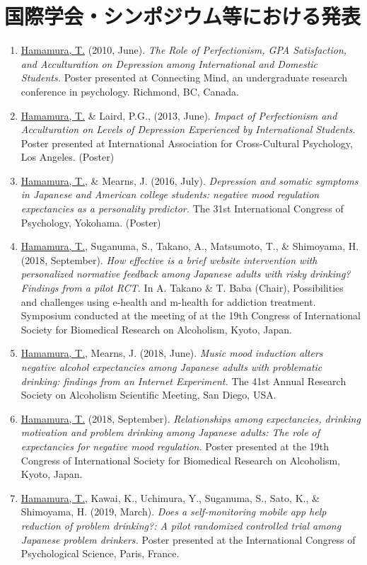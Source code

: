 \documentclass{article}
\begin{document}
\section{国際学会・シンポジウム等における発表}
\begin{enumerate}
	\item \underline{Hamamura, T.} (2010, June). \textit{The Role of Perfectionism, GPA Satisfaction, and Acculturation on Depression among International and Domestic Students.} Poster presented at Connecting Mind, an undergraduate research conference in psychology. Richmond, BC, Canada.
	\item \underline{Hamamura, T.} \& Laird, P.G., (2013, June). \textit{Impact of Perfectionism and Acculturation on Levels of Depression Experienced by International Students.} Poster presented at International Association for Cross-Cultural Psychology, Los Angeles. (Poster)
	\item \underline{Hamamura, T.}, \& Mearns, J. (2016, July). \textit{Depression and somatic symptoms in Japanese and American college students: negative mood regulation expectancies as a personality predictor.} The 31st International Congress of Psychology, Yokohama. (Poster)
	\item \underline{Hamamura, T.}, Suganuma, S., Takano, A., Matsumoto, T., \& Shimoyama, H. (2018, September). \textit{How effective is a brief website intervention with personalized normative feedback among Japanese adults with risky drinking? Findings from a pilot RCT.} In A. Takano \& T. Baba (Chair), Possibilities and challenges using e-health and m-health for addiction treatment. Symposium conducted at the meeting of at the 19th Congress of International Society for Biomedical Research on Alcoholism, Kyoto, Japan.
	\item \underline{Hamamura, T.}, Mearns, J. (2018, June). \textit{Music mood induction alters negative alcohol expectancies among Japanese adults with problematic drinking: findings from an Internet Experiment.} The 41st Annual Research Society on Alcoholism Scientific Meeting, San Diego, USA.
	\item \underline{Hamamura, T.} (2018, September). \textit{Relationships among expectancies, drinking motivation and problem drinking among Japanese adults: The role of expectancies for negative mood regulation.} Poster presented at the 19th Congress of International Society for Biomedical Research on Alcoholism, Kyoto, Japan.
	\item \underline{Hamamura, T.}, Kawai, K., Uchimura, Y., Suganuma, S., Sato, K., \& Shimoyama, H. (2019, March). \textit{Does a self-monitoring mobile app help reduction of problem drinking?: A pilot randomized controlled trial among Japanese problem drinkers.} Poster presented at the International Congress of Psychological Science, Paris, France.

\end{enumerate}
\end{document}
